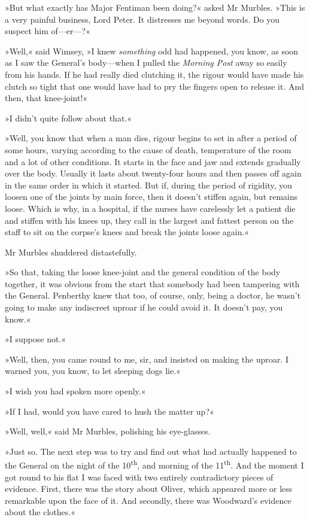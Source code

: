 »But what exactly has Major Fentiman been doing?« asked Mr Murbles. »This is a very painful business, Lord Peter. It distresses me beyond words. Do you suspect him of—er—?«

»Well,« said Wimsey, »I knew \textit{something} odd had happened, you know, as soon as I saw the General's body—when I pulled the \textit{Morning Post} away so easily from his hands. If he had really died clutching it, the rigour would have made his clutch so tight that one would have had to pry the fingers open to release it. And then, that knee-joint!«

»I didn't quite follow about that.«

»Well, you know that when a man dies, rigour begins to set in after a period of some hours, varying according to the cause of death, temperature of the room and a lot of other conditions. It starts in the face and jaw and extends gradually over the body. Usually it lasts about twenty-four hours and then passes off again in the same order in which it started. But if, during the period of rigidity, you loosen one of the joints by main force, then it doesn't stiffen again, but remains loose. Which is why, in a hospital, if the nurses have carelessly let a patient die and stiffen with his knees up, they call in the largest and fattest person on the staff to sit on the corpse's knees and break the joints loose again.«

Mr Murbles shuddered distastefully.

»So that, taking the loose knee-joint and the general condition of the body together, it was obvious from the start that somebody had been tampering with the General. Penberthy knew that too, of course, only, being a doctor, he wasn't going to make any indiscreet uproar if he could avoid it. It doesn't pay, you know.«

»I suppose not.«

»Well, then, you came round to me, sir, and insisted on making the uproar. I warned you, you know, to let sleeping dogs lie.«

»I wish you had spoken more openly.«

»If I had, would you have cared to hush the matter up?«

»Well, well,« said Mr Murbles, polishing his eye-glasses.

»Just so. The next step was to try and find out what had actually happened to the General on the night of the  10\textsuperscript{th}, and morning of the  11\textsuperscript{th}. And the moment I got round to his flat I was faced with two entirely contradictory pieces of evidence. First, there was the story about Oliver, which appeared more or less remarkable upon the face of it. And secondly, there was Woodward's evidence about the clothes.«

